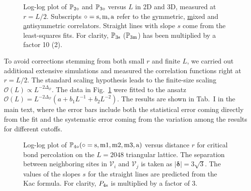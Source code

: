 \documentclass[aps,prl,twocolumn,showpacs,superscriptaddress,groupedaddress]{revtex4}  %
\def\bbp{{\mathbb P}}
\begin{document}
\begin{figure}[h]
\caption{\label{fig:alphaL} Log-log plot of $\mathbb P_{\rm 2\circ}$  and $\mathbb P_{\rm 3\circ}$ versus $L$ in 2D and 3D,
measured at $r=L/2$.
Subscripts $\circ={\rm s}, {\rm m}, {\rm a}$ refer to the
\underline{s}ymmetric, \underline{m}ixed and \underline{a}ntisymmetric correlators.
Straight lines with slope $s$ come from the least-squares fits.
For clarity,  $\bbp_{\rm 3s}$ ($\bbp_{\rm 3 m}$) has been multiplied by a factor 10 (2). 
}
\end{figure}

To avoid corrections stemming from both small $r$ and finite $L$, we carried out additional extensive simulations
and measured the correlation functions right at $r= L/2$. 
The standard scaling hypothesis leads to the finite-size scaling $ \mathcal{O} (L) \propto L^{-2 \Delta_{\mathcal{O}} }$.
The data in Fig.~\ref{fig:alphaL} were fitted to 
the ansatz  $\mathcal{O} (L) = L^{-2 \Delta_{\mathcal{O}}} (a+b_1 L ^{-1} +b_2 L^{-2})$.
The results are shown in Tab.~I in the main text, 
where the error bars include both 
the statistical error coming directly from the fit and the systematic error coming from the variation among the results for different cutoffs.


\begin{figure}
\caption{\label{fig:4N} Log-log plot of $\mathbb P_{\rm 4\circ}({\rm \circ=s,m1,m2,m3,a})$ versus distance $r$ for
critical bond percolation on the $L=2048$ triangular lattice.
The separation between neighboring sites in $\mathcal{V}_i$ and $\mathcal{V}_j$ is taken as $|\boldsymbol\delta| = 3\sqrt{3}$.
The values of the slopes $s$ for the straight lines are predicted from the Kac formula. 
For clarity,  $P_{\rm 4s}$ is multiplied by a factor of 3. 
    }
\end{figure}
\end{document}
